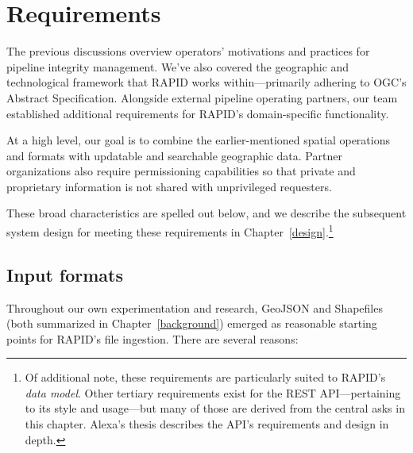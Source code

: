 \chapter{Requirements}
\label{requirements}

The previous discussions overview operators' motivations and practices for pipeline integrity management. We've also covered the geographic and technological framework that RAPID works within---primarily adhering to OGC's Abstract Specification. Alongside external pipeline operating partners, our team established additional requirements for RAPID's domain-specific functionality.

At a high level, our goal is to combine the earlier-mentioned spatial operations and formats with updatable and searchable  geographic data. Partner organizations also require permissioning capabilities so that private and proprietary information is not shared with unprivileged requesters.

These broad characteristics are spelled out below, and we describe the subsequent system design for meeting these requirements in Chapter~\ref{design}.\footnote{Of additional note, these requirements are particularly suited to RAPID's \textit{data model}. Other tertiary requirements exist for the REST API---pertaining to its style and usage---but many of those are derived from the central asks in this chapter. Alexa's thesis describes the API's requirements and design in depth.}

\section{Input formats}

Throughout our own experimentation and research, GeoJSON and Shapefiles (both summarized in Chapter~\ref{background}) emerged as reasonable starting points for RAPID's file ingestion. There are several reasons:

